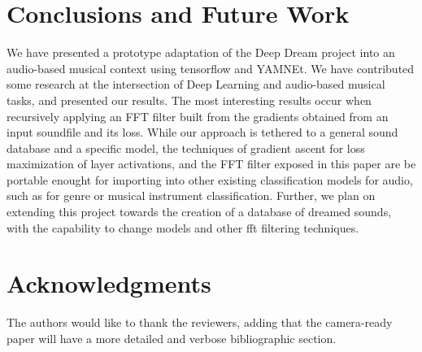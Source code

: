 \documentclass{nime-alternate}
\begin{document}
\section{Conclusions and Future Work}
We have presented a prototype adaptation of the Deep Dream project into an audio-based musical context using tensorflow and YAMNEt. We have contributed some research at the intersection of Deep Learning and audio-based musical tasks, and presented our results. The most interesting results occur when recursively applying an FFT filter built from the gradients obtained from an input soundfile and its loss. While our approach is tethered to a general sound database and a specific model, the techniques of gradient ascent for loss maximization of layer activations, and the FFT filter exposed in this paper are be portable enought for importing into other existing classification models for audio, such as for genre or musical instrument classification. Further, we plan on extending this project towards the creation of a database of dreamed sounds, with the capability to change models and other fft filtering techniques.

\section{Acknowledgments}
The authors would like to thank the reviewers, adding that the camera-ready paper will have a more detailed and verbose bibliographic section.
% 
%  
\end{document}
